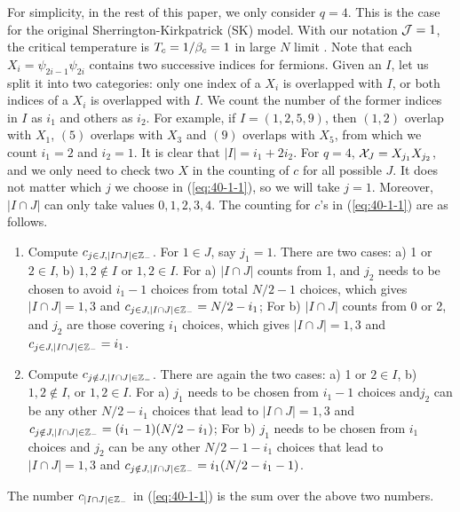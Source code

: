 \documentclass[11pt]{article}
\renewcommand{\>}{\rangle}
\newcommand{\<}{\langle}
\begin{document}
For simplicity, in the rest of this paper, we only consider $q=4$. This is the case for the original Sherrington-Kirkpatrick (SK) model. With our notation $\mathcal{J}=1$, the critical temperature is $T_c=1/\beta_c=1$ in large $N$ limit \cite{sherrington1975solvable}.
Note that each $X_{i}=\psi_{2i-1}\psi_{2i}$ contains two successive
indices for fermions. Given an $I$, let us split it into two categories:
only one index of a $X_{i}$ is overlapped with $I$, or both indices
of a $X_{i}$ is overlapped with $I$. We count the number of the
former indices in $I$ as $i_{1}$ and others as $i_{2}.$ For example,
if $I=(1,2,5,9)$, then $(1,2)$ overlap with $X_{1}$, $(5)$ overlaps
with $X_{3}$ and $(9)$ overlaps with $X_{5}$, from which we count
$i_{1}=2$ and $i_{2}=1$. It is clear that $|I|=i_{1}+2i_{2}$. For
$q=4$, $\mathcal{X}_{J}=X_{j_{1}}X_{j_{2}}$, and we only need to check two
$X$ in the counting of $c$ for all possible $J$. It does not matter
which $j$ we choose in (\ref{eq:40-1-1}), so we will take $j=1$.
Moreover, $|I\cap J|$ can only take values $0,1,2,3,4$. The counting
for $c$'s in (\ref{eq:40-1-1}) are as follows.
\begin{enumerate}
\item Compute $c_{j\in J,|I\cap J|\in\mathbb{Z}_{-}}$. For $1\in J$, say $j_{1}=1$.
There are two cases: a) 1 or $2\in I$, b) $1,2\notin I$ or $1,2\in I$.
For a) $|I\cap J|$ counts from 1, and $j_{2}$ needs to be chosen
to avoid $i_{1}-1$ choices from total $N/2-1$ choices, which gives
$|I\cap J|=1,3$ and $c_{j\in J,|I\cap J|\in\mathbb{Z}_{-}}=N/2-i_{1}$; For
b) $|I\cap J|$ counts from 0 or 2, and $j_{2}$ are those covering
$i_{1}$ choices, which gives $|I\cap J|=1,3$ and $c_{j\in J,|I\cap J|\in\mathbb{Z}_{-}}=i_{1}$. 
\item Compute $c_{j\notin J,|I\cap J|\in\mathbb{Z}_{-}}$. There are again the two
cases: a) 1 or $2\in I$, b) $1,2\notin I$, or $1,2\in I$. For a)
$j_{1}$ needs to be chosen from $i_{1}-1$ choices and$j_{2}$ can
be any other $N/2-i_{1}$ choices that lead to $|I\cap J|=1,3$ and
$c_{j\notin J,|I\cap J|\in\mathbb{Z}_{-}}=(i_{1}-1)(N/2-i_{1})$; For b) $j_{1}$
needs to be chosen from $i_{1}$ choices and $j_{2}$ can be any other
$N/2-1-i_{1}$ choices that lead to $|I\cap J|=1,3$ and $c_{j\notin J,|I\cap J|\in\mathbb{Z}_{-}}=i_{1}(N/2-i_{1}-1)$.
\end{enumerate}
The number $c_{|I\cap J|\in\mathbb{Z}_{-}}$ in (\ref{eq:40-1-1}) is the
sum over the above two numbers. 
\end{document}
